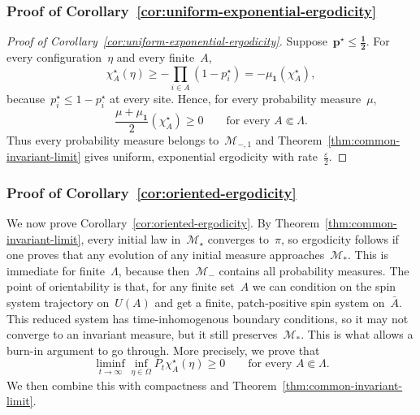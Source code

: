 \documentclass[EJP,preprint,NODS,nobera]{ejpecp}
\newcommand{\bb}[1]{\left(#1\right)}
\newcommand{\mb}[1]{\mathbf{#1}}
\newcommand{\mbs}[1]{\boldsymbol{#1}}
\begin{document}
\subsubsection{\texorpdfstring{Proof of Corollary~\ref{cor:uniform-exponential-ergodicity}}{Proof of the first corollary}}
\label{subsec:proof-uniform-exponential}

\begin{proof}[Proof of Corollary~\ref{cor:uniform-exponential-ergodicity}]
Suppose~$\mb p^\star\leq\mbs{\tfrac12}$. For every configuration~$\eta$
and every finite~$A$,
\begin{equation*}
\chi_A^\star(\eta)
\geq
-\prod_{i\in A}\bb{1-p_i^\star}
=
-\mu_{\mb 1}(\chi_A^\star),
\end{equation*}
because~$p_i^\star\leq1-p_i^\star$ at every site. Hence, for every
probability measure~$\mu$,
\begin{equation*}
\frac{\mu+\mu_{\mb 1}}2
\bb{\chi_A^\star}
\geq0
\qquad
\text{for every }A\Subset\Lambda.
\end{equation*}
Thus every probability measure belongs to~$\mathcal M_{-,1}$ and
Theorem~\ref{thm:common-invariant-limit} gives uniform, exponential ergodicity with rate~$\frac{\varepsilon}{2}$.
\end{proof}

\subsubsection{\texorpdfstring{Proof of Corollary~\ref{cor:oriented-ergodicity}}{Proof of the second corollary}}
\label{subsec:proof-orientability}

We now prove Corollary~\ref{cor:oriented-ergodicity}. By
Theorem~\ref{thm:common-invariant-limit}, every initial law in~$\mathcal M_\star$ converges to~$\pi$, so ergodicity follows if one proves that any evolution of any initial measure approaches~$\mathcal{M}_*$. This is immediate  for finite~$\Lambda$, because then~$\mathcal{M}_-$ contains all probability measures. The point of orientability is that,
for any finite set~$A$ we can condition on the spin system trajectory on~$U(A)$ and get a finite, patch-positive spin system on~$\bar{A}$. This reduced system has time-inhomogenous boundary conditions, so it may not converge to an invariant measure, but it still preserves~$\mathcal{M}_*$. This is what allows a burn-in argument to go through. More precisely, we prove that
\begin{equation*}
\liminf_{t\to\infty}
\inf_{\eta\in\Omega}
P_t\chi_A^\star(\eta)
\geq0
\qquad
\text{for every }A\Subset\Lambda.
\end{equation*}
We then combine this with compactness and
Theorem~\ref{thm:common-invariant-limit}.
\end{document}
